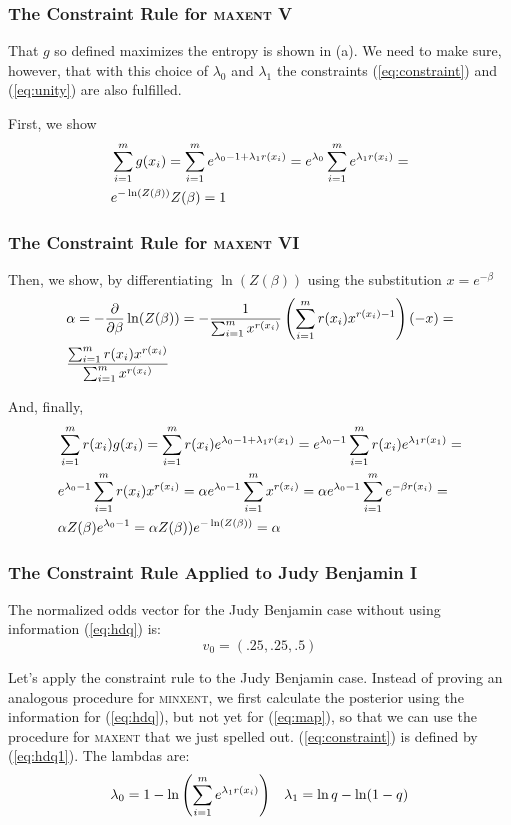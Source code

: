 \documentclass[xcolor=dvipsnames]{beamer}
\begin{document}
\begin{frame}
  \frametitle{The Constraint Rule for \textsc{maxent} V}
  That $g$ so defined maximizes the entropy is shown in (a). We need
  to make sure, however, that with this choice of $\lambda_{0}$ and
  $\lambda_{1}$ the constraints ({\ref{eq:constraint}}) and
  ({\ref{eq:unity}}) are also fulfilled.

  First, we show
  \begin{align}
    &\sum_{i=1}^{m}g(x_{i})=\sum_{i=1}^{m}e^{\lambda_{0}-1+\lambda_{1}r(x_{i})}=e^{\lambda_{0}}\sum_{i=1}^{m}e^{\lambda_{1}r(x_{i})}=\notag\\
    &e^{-\ln(Z(\beta))}Z(\beta)=1\label{eq:unishow}
  \end{align}
\end{frame}

\begin{frame}
  \frametitle{The Constraint Rule for \textsc{maxent} VI}
  Then, we show, by differentiating $\ln(Z(\beta))$ using the
  substitution $x=e^{-\beta}$
  \begin{align}
    &\alpha=-\frac{\partial}{\partial{}\beta}\ln(Z(\beta))=-\frac{1}{\sum_{i=1}^{m}x^{r(x_{i})}}\left(\sum_{i=1}^{m}r(x_{i})x^{r(x_{i})-1}\right)(-x)=\notag\\
    &\frac{\sum_{i=1}^{m}r(x_{i})x^{r(x_{i})}}{\sum_{i=1}^{m}x^{r(x_{i})}}\label{eq:alphashow}
  \end{align}

  And, finally,
  \begin{align}
    &\sum_{i=1}^{m}r(x_{i})g(x_{i})=\sum_{i=1}^{m}r(x_{i})e^{\lambda_{0}-1+\lambda_{1}r(x_{1})}=e^{\lambda_{0}-1}\sum_{i=1}^{m}r(x_{i})e^{\lambda_{1}r(x_{1})}=\notag\\
    &e^{\lambda_{0}-1}\sum_{i=1}^{m}r(x_{i})x^{r(x_{i})}=\alpha{}e^{\lambda_{0}-1}\sum_{i=1}^{m}x^{r(x_{i})}=\alpha{}e^{\lambda_{0}-1}\sum_{i=1}^{m}e^{-\beta{}r(x_{i})}=\notag\\
    &\alpha{}Z(\beta)e^{\lambda_{0}-1}=\alpha{}Z(\beta))e^{-\ln(Z(\beta))}=\alpha\label{eq:finalshow}
  \end{align}
\end{frame}

\begin{frame}
  \frametitle{The Constraint Rule Applied to Judy Benjamin I}
  The normalized odds vector for the Judy Benjamin case without using
  information ({\ref{eq:hdq}}) is:
  \begin{displaymath}
    v_{0}=(.25,.25,.5)
  \end{displaymath}

  Let's apply the constraint rule to the Judy Benjamin case. Instead
  of proving an analogous procedure for \textsc{minxent}, we first
  calculate the posterior using the information for ({\ref{eq:hdq}}),
  but not yet for ({\ref{eq:map}}), so that we can use the procedure
  for \textsc{maxent} that we just spelled out.
  ({\ref{eq:constraint}}) is defined by ({\ref{eq:hdq1}}). The lambdas
  are:
  \begin{align}
    &\lambda_{0}=1-\ln\left(\sum_{i=1}^{m}e^{\lambda_{1}r(x_{i})}\right)\notag
    &\lambda_{1}=\ln{}q-\ln(1-q)\notag
  \end{align}
\end{frame}
\end{document}
